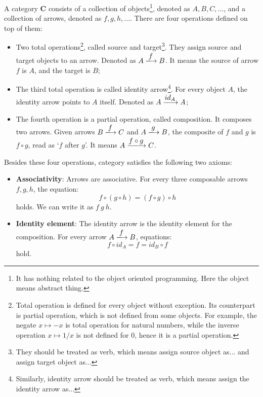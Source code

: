 \documentclass{article}
\begin{document}
 
\begin{definition}
\normalfont
A category $\pmb{C}$ consists of a collection of objects\footnote{It has nothing related to the object oriented programming. Here the object means abstract thing.}, denoted as $A, B, C, ...$, and a collection of arrows, denoted as $f, g, h, ...$. There are four operations defined on top of them:
\begin{itemize}
\item Two total operations\footnote{Total operation is defined for every object without exception. Its counterpart is partial operation, which is not defined from some objects. For example, the negate $x \mapsto -x$ is total operation for natural numbers, while the inverse operation $x \mapsto 1/x$ is not defined for 0, hence it is a partial operation.}, called source and target\footnote{They should be treated as verb, which means assign source object as... and assign target object as...}. They assign source and target objects to an arrow. Denoted as $A \arrowto{f} B$. It means the source of arrow $f$ is $A$, and the target is $B$;

\item The third total operation is called identity arrow\footnote{Similarly, identity arrow should be treated as verb, which means assign the identity arrow as...}. For every object $A$, the identity arrow points to $A$ itself. Denoted as $A \arrowto{id_A} A$;

\item The fourth operation is a partial operation, called composition. It composes two arrows. Given arrows $B \arrowto{f} C$ and $A \arrowto{g} B$, the composite of $f$ and $g$ is $f \circ g$, read as `$f$ after $g$'. It means $A \arrowto{f \circ g} C$.

\end{itemize}

Besides these four operations, category satisfies the following two axioms:

\begin{itemize}
\item \textbf{Associativity}: Arrows are associative. For every three composable arrows $f, g, h$, the equation:
\[
f \circ (g \circ h) = (f \circ g) \circ h
\]
holds. We can write it as $f\ g\ h$.
\item \textbf{Identity element}: The identity arrow is the identity element for the composition. For every arrow $A \arrowto{f} B$, equations:
\[
f \circ id_A = f = id_B \circ f
\]
hold.
\end{itemize}
\end{definition}
\end{document}

